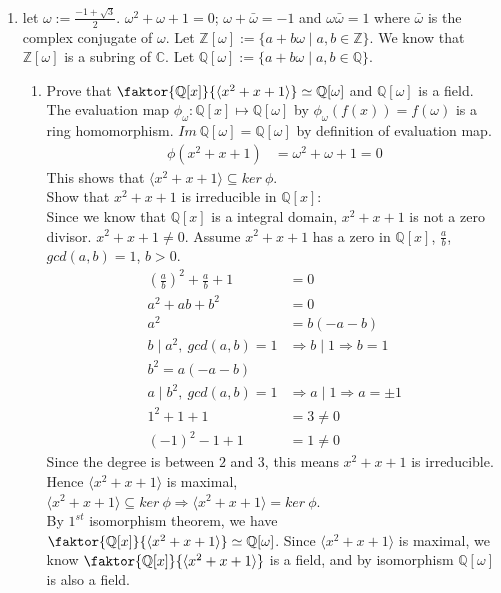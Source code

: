 \documentclass[12pt]{article}
\begin{document}
\begin{enumerate}
	\item let $\omega := \frac{-1 + \sqrt{3}}{2}$. $\omega^2 + \omega + 1 = 0$;
		$\omega + \bar{\omega} = -1$ and $\omega\bar{\omega} = 1$ where
		$\bar{\omega}$ is the complex conjugate of $\omega$. Let $\mathbb{Z}[\omega]
		:= \{a + b\omega \mid a,b \in \mathbb{Z}\}$. We know that
		$\mathbb{Z}[\omega]$ is a subring of $\mathbb{C}$. Let $\mathbb{Q}[\omega]
		:= \{a+b\omega \mid a, b \in \mathbb{Q}\}$.
		\begin{enumerate}
			\item Prove that $\faktor{\mathbb{Q}[x]}{\langle x^2 + x + 1 \rangle}
				\simeq \mathbb{Q}[\omega]$ and $\mathbb{Q}[\omega]$ is a field.\\
				The evaluation map $\phi_{\omega}:\mathbb{Q}[x] \mapsto
				\mathbb{Q}[\omega]$ by $\phi_{\omega}(f(x)) = f(\omega)$ is a ring
				homomorphism. $Im\ \mathbb{Q}[\omega] = \mathbb{Q}[\omega]$ by
				definition of evaluation map.
				\begin{align*}
					\phi(x^2 + x + 1) &= \omega^2 + \omega + 1 = 0
				\end{align*}
				This shows that $\langle x^2 + x + 1 \rangle \subseteq ker\ \phi$. \\
				Show that $x^2 + x + 1$ is irreducible in $\mathbb{Q}[x]$:\\
				Since we know that $\mathbb{Q}[x]$ is a integral domain, $x^2
				+ x + 1$ is not a zero divisor. $x^2 + x + 1 \neq 0$. Assume $x^2 + x +
				1$ has a zero in $\mathbb{Q}[x]$, $\frac{a}{b}$, $gcd(a,b) = 1$, $b>0$.
				\begin{align*}
					\left(\frac{a}{b} \right)^2 + \frac{a}{b} + 1 &= 0\\
					a^2 + ab + b^2 &= 0\\
					a^2 &= b(-a-b)\\
					b \mid a^2,\ gcd(a,b)=1 &\Rightarrow b \mid 1 \Rightarrow b=1\\
					b^2 = a(-a-b)\\
					a \mid b^2,\ gcd(a,b)=1 &\Rightarrow a \mid 1 \Rightarrow a= \pm 1\\
					1^2 + 1 + 1 &= 3 \neq 0\\
					(-1)^2 - 1 + 1 &= 1 \neq 0
				\end{align*}
				Since the degree is between $2$ and $3$, this means $x^2 + x + 1$ is
				irreducible. Hence $\langle x^2 + x + 1 \rangle$ is maximal, $\langle
				x^2 + x + 1 \rangle \subseteq ker\ \phi \Rightarrow \langle
				x^2 + x + 1 \rangle = ker\ \phi$.\\
				By $1^{st}$ isomorphism theorem, we have $\faktor{\mathbb{Q}[x]}{\langle
				x^2 + x + 1 \rangle} \simeq \mathbb{Q}[\omega]$. Since $\langle x^2 + x
				+ 1 \rangle$ is maximal, we know $\faktor{\mathbb{Q}[x]}{\langle
				x^2 + x + 1 \rangle}$ is a field, and by isomorphism
				$\mathbb{Q}[\omega]$ is also a field.


\end{enumerate}
\end{enumerate}
\end{document}

